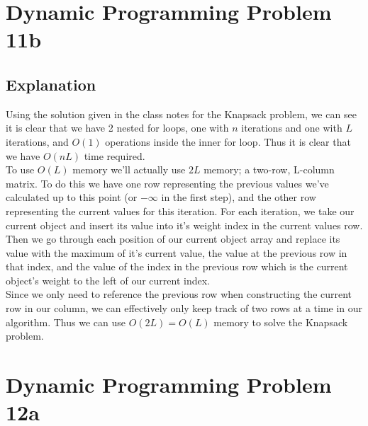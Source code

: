 \documentclass[12pt]{article}
\begin{document}
	
	
	\section*{Dynamic Programming Problem 11b}

	\subsection*{Explanation}
	
Using the solution given in the class notes for the Knapsack problem, we can see it is clear that we have 2 nested for loops, one with $n$ iterations and one with $L$ iterations, and $O(1)$ operations inside the inner for loop. Thus it is clear that we have $O(nL)$ time required.\\
To use $O(L)$ memory we'll actually use $2L$ memory; a two-row, L-column matrix. To do this we have one row representing the previous values we've calculated up to this point (or $-\infty$ in the first step), and the other row representing the current values for this iteration. For each iteration, we take our current object and insert its value into it's weight index in the current values row. Then we go through each position of our current object array and replace its value with the maximum of it's current value, the value at the previous row in that index, and the value of the index in the previous row which is the current object's weight to the left of our current index.\\
Since we only need to reference the previous row when constructing the current row in our column, we can effectively only keep track of two rows at a time in our algorithm. Thus we can use $O(2L) = O(L)$ memory to solve the Knapsack problem.

\section*{Dynamic Programming Problem 12a}
	
	
	
\end{document}
